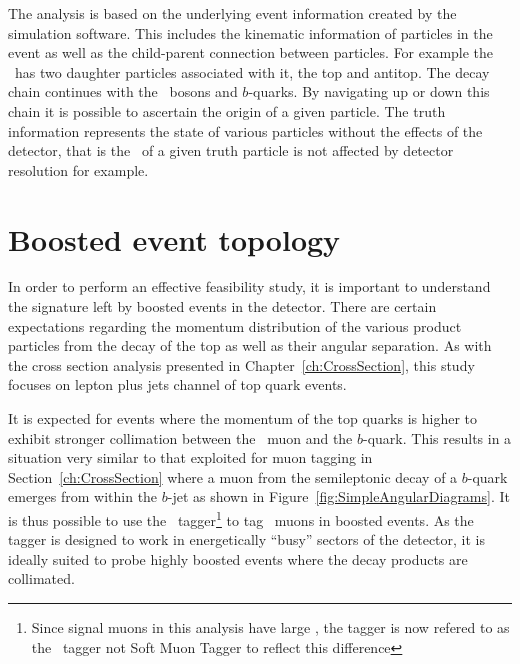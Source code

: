 The analysis is based on the underlying event information created by the simulation software. This includes the kinematic information of particles in the event as well as the child-parent connection between particles. For example the \Zprime\ has two daughter particles associated with it, the top and antitop. The decay chain continues with the \W\ bosons and $b$-quarks. By navigating up or down this chain it is possible to ascertain the origin of a given particle. The truth information represents the state of various particles without the effects of the detector, that is the \pt\ of a given truth particle is not affected by detector resolution for example.

\section{Boosted event topology}

In order to perform an effective feasibility study, it is important to understand the signature left by boosted events in the detector. There are certain expectations regarding the momentum distribution of the various product particles from the decay of the top as well as their angular separation. As with the cross section analysis presented in Chapter~\ref{ch:CrossSection}, this study focuses on lepton plus jets channel of top quark events.

It is expected for events where the momentum of the top quarks is higher to exhibit stronger collimation between the \W\ muon and the $b$-quark. This results in a situation very similar to that exploited for muon tagging in Section~\ref{ch:CrossSection} where a muon from the semileptonic decay of a $b$-quark emerges from within the $b$-jet as shown in Figure~\ref{fig:SimpleAngularDiagrams}. It is thus possible to use the \xsm\ tagger\footnote{Since signal muons in this analysis have large \pt, the tagger is now refered to as the \xsm\ tagger not Soft Muon Tagger to reflect this difference} to tag \W\ muons in boosted events. As the tagger is designed to work in energetically ``busy'' sectors of the detector, it is ideally suited to probe highly boosted events where the decay products are collimated.

